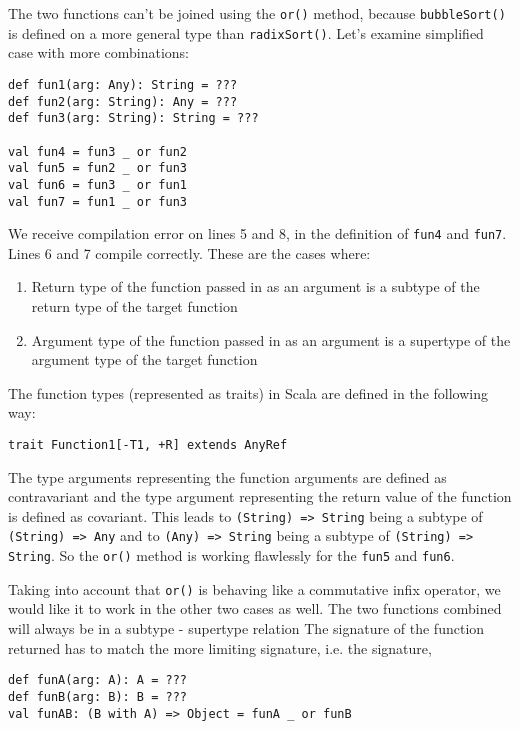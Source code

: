 The two functions can't be joined using the \lstinline|or()| method, because \lstinline|bubbleSort()| is defined on a more general type than \lstinline|radixSort()|. Let's examine simplified case with more combinations:

\lstset{style=Scala}
\begin{lstlisting}
def fun1(arg: Any): String = ???
def fun2(arg: String): Any = ???
def fun3(arg: String): String = ???

val fun4 = fun3 _ or fun2
val fun5 = fun2 _ or fun3
val fun6 = fun3 _ or fun1
val fun7 = fun1 _ or fun3
\end{lstlisting}

We receive compilation error on lines 5 and 8, in the definition of \lstinline|fun4| and \lstinline|fun7|. Lines 6 and 7 compile correctly. These are the cases where:

\begin{enumerate}
	\item Return type of the function passed in as an argument is a subtype of the return type of the target function
	\item Argument type of the function passed in as an argument is a supertype of the argument type of the target function
\end{enumerate}

The function types (represented as traits) in Scala are defined in the following way:
\lstset{style=Scala}
\begin{lstlisting}
trait Function1[-T1, +R] extends AnyRef
\end{lstlisting}

The type arguments representing the function arguments are defined as contravariant and the type argument representing the return value of the function is defined as covariant. This leads to \lstinline|(String) => String| being a subtype of \lstinline|(String) => Any| and to \lstinline|(Any) => String| being a subtype of \lstinline|(String) => String|. So the \lstinline|or()| method is working flawlessly for the \lstinline|fun5| and \lstinline|fun6|.

Taking into account that \lstinline|or()| is behaving like a commutative infix operator, we would like it to work in the other two cases as well. The two functions combined will always be in a subtype - supertype relation The signature of the function returned has to match the more limiting signature, i.e. the signature,

\begin{lstlisting}
def funA(arg: A): A = ???
def funB(arg: B): B = ???
val funAB: (B with A) => Object = funA _ or funB
\end{lstlisting}

